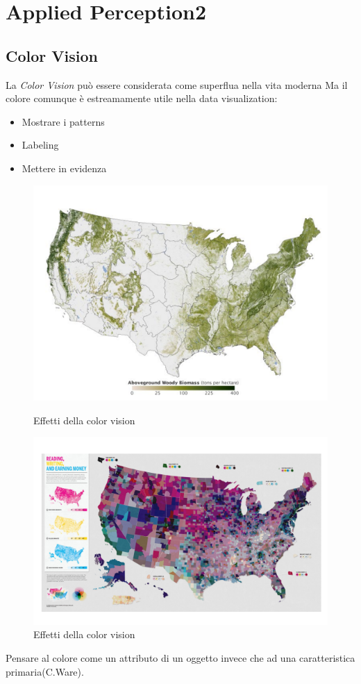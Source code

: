 \section{Applied Perception2 }
\subsection{Color Vision}
La \textit{Color Vision} può essere considerata come superflua nella vita moderna
Ma il colore comunque è estreamamente utile nella data visualization:
\begin{itemize}
    \item Mostrare i patterns
    \item Labeling
    \item Mettere in evidenza
\end{itemize}
\begin{figure}[H]
    \centering
    \begin{minipage}{0.45\textwidth}
        \centering
        \includegraphics[width=\linewidth]{images/ColorVision.png} 
        \caption{Effetti della color vision}
        \label{fig:immagine1}
    \end{minipage}\hfill
    \begin{minipage}{0.45\textwidth}
        \centering
        \includegraphics[width=\linewidth]{images/ColorVision2.png} 
        \caption{Effetti della color vision}
        \label{fig:immagine2}
    \end{minipage}
\end{figure}
Pensare al colore come un attributo di un oggetto invece che ad una caratteristica primaria(C.Ware).
